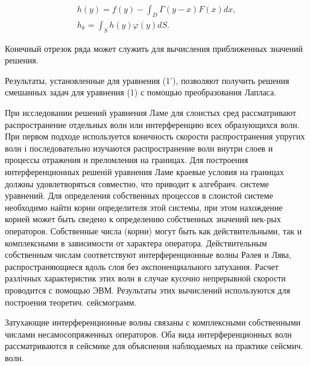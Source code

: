 \documentclass[10pt]{article}
\begin{document}
\[

\begin{gathered}

h(y)=f(y)-\int_{D} \Gamma(y-x) F(x) d x, \\

h_{k}=\int_{S} h(y) \varphi(y) d S .

\end{gathered}

\]



Конечный отрезок ряда может служить для вычисления приближенных значений решения.



Результаты, установленные для уравнения (1'), позволяют получить решения смешанных задач для уравнения (1) с помощью преобразования Лапласа.



При исследовании решений уравнения Ламе для слоистых сред рассматривают распространение отдельных волн или интерференцию всех образующихся волн. При первом подходе используется конечность скорости распространения упругих волн і последовательно изучаются распространение волн внутри слоев и процессы отражения и преломления на границах. Для построения интерференционных решеній уравнения Ламе краевые условия на границах должны удовлетворяться совместно, что приводит к алгебраич. системе уравнений. Для определения собственных процессов в слоистой системе необходимо найти корни определителя этой системы, при этом нахождение корней может быть сведено к определению собственных значений нек-рых операторов. Собственные числа (корни) могут быть как действительными, так и комплексными в зависимости от характера оператора. Действительным собственным числам соответствуют интерференционные волны Рәлея и Лява, распространяющиеся вдоль слоя без әкспоненциального затухания. Расчет разлічных характеристик этих волн в случае кусочно непрерывной скорости проводится с помощью ЭВМ. Результаты этих вычислений используются для построения теоретич. сейсмограмм.



Затухающие интерференционные волны связаны с комплексными собственными числами несамосопряженных операторов. Оба вида интерференционных волн рассматриваются в сейсмике для объяснения наблюдаемых на практике сейсмич. волн.
\end{document}
